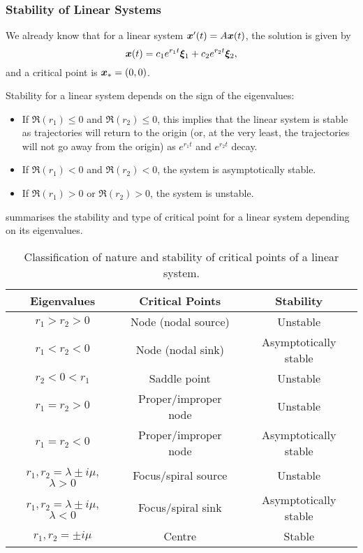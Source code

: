 \subsubsection{Stability of Linear Systems}

We already know that for a linear system $\bm{x}'(t) = A\bm{x}(t)$, the solution is given by
\[
\bm{x}(t) = c_1e^{r_1t}\bm{\xi}_1 + c_2e^{r_2t}\bm{\xi}_2,
\]
and a critical point is $\bm{x}_{\ast} = (0,0)$.

Stability for a linear system depends on the sign of the eigenvalues:
\begin{itemize}
	\item If $\Re(r_1) \leq 0$ and $\Re(r_2) \leq 0$, this implies that the linear system is stable as trajectories will return to the origin (or, at the very least, the trajectories will not go away from the origin) as $e^{r_1t}$ and $e^{r_2t}$ decay.
	\item If $\Re(r_1)<0$ and $\Re(r_2)<0$, the system is asymptotically stable.
	\item If $\Re(r_1)>0$ or $\Re(r_2)>0$, the system is unstable.
\end{itemize}

 summarises the stability and type of critical point for a linear system depending on its eigenvalues.

\begin{table}[H]
	\begin{center}
		\begin{tabular}{c|c|c}
			Eigenvalues & Critical Points & Stability \\
			\hline
			$r_1 > r_2 > 0$ & Node (nodal source) & Unstable \\
			$r_1 < r_2 < 0$ & Node (nodal sink) & Asymptotically stable \\
			$r_2 < 0 < r_1$ & Saddle point & Unstable \\
			$r_1 = r_2 > 0$ & Proper/improper node & Unstable \\
			$r_1 = r_2 < 0$ & Proper/improper node & Asymptotically stable \\
			$r_1,r_2 = \lambda \pm i\mu$, $\lambda>0$ & Focus/spiral source & Unstable \\
			$r_1,r_2 = \lambda \pm i\mu$, $\lambda<0$ & Focus/spiral sink & Asymptotically stable \\
			$r_1,r_2 = \pm i\mu$ & Centre & Stable \\
		\end{tabular}
	\end{center}
	\caption{Classification of nature and stability of critical points of a linear system.}
	\label{table:stability}
\end{table}

